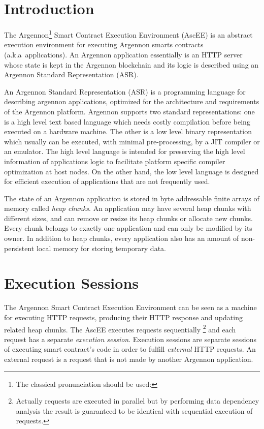 

\section{Introduction}\label{sec:introduction}

The Argennon\footnote{The classical pronunciation should be used:} Smart Contract Execution
Environment (AscEE) is an abstract execution environment for executing Argennon smarts contracts (a.k.a\ applications).
An Argennon application essentially is an HTTP server whose state is kept in the Argennon blockchain and
its logic is described using an Argennon Standard Representation (ASR).

An Argennon Standard Representation (ASR) is a programming language for describing argennon applications, optimized
for the architecture and requirements of the Argennon platform.
Argennon supports two standard representations: one is a high level text based language which needs
costly compilation before being executed on a hardware machine. The other is a low level binary representation which
usually can be executed, with minimal pre-processing, by a JIT compiler or an emulator. The high level
language is intended for preserving the high level information of applications logic to facilitate
platform specific compiler optimization at host nodes. On the other hand, the low level language is designed for
efficient execution of applications that are not frequently used.

The state of an Argennon application is stored in byte addressable finite arrays of memory called
\emph{heap chunks}. An application may have several heap chunks with different sizes, and can remove or
resize its heap chunks or allocate new chunks. Every chunk belongs to exactly one application and can only be modified
by its owner. In addition to heap chunks, every application also has an amount of non-persistent local memory for
storing temporary data.


\section{Execution Sessions}\label{sec:sessions}

The Argennon Smart Contract Execution Environment can be seen as a machine for executing HTTP requests, producing
their HTTP response and updating related heap chunks. The AscEE executes requests sequentially \footnote{Actually
requests are executed in parallel but by performing data dependency analysis the result is guaranteed to be identical
with sequential execution of requests.} and each request has a separate \emph{execution session}. Execution sessions
are separate sessions of executing smart contract's code in order to fulfill \emph{external} HTTP requests. An
external request is a request that is not made by another Argennon application.

